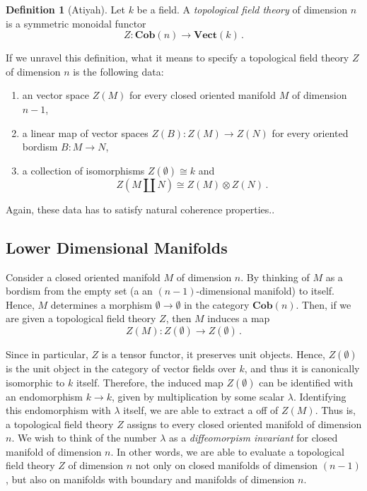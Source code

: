 \documentclass[a4paper,11pt]{article}
\theoremstyle{plain}
\theoremstyle{definition}
\newtheorem{defi}[thm]{Definition}
\theoremstyle{remark}
\begin{document}
\begin{defi}[Atiyah]
Let $k$ be a field. A \textit{topological field theory} of dimension $n$ is a symmetric monoidal functor 
$$Z \colon \textbf{Cob}(n) \to \textbf{Vect}(k) \, .$$
\end{defi}


If we unravel this definition, what it means to specify a topological field theory $Z$ of dimension $n$ is the following data:
\begin{enumerate}[label = \roman*)]
    \item an vector space $Z(M)$ for every closed oriented manifold $M$ of dimension $n-1$, 
    \item a linear map of vector spaces $Z(B) \colon Z(M) \to Z(N)$ for every oriented bordism $B \colon M \to N$, 
    \item a collection of isomorphisms $Z(\emptyset) \cong k$ and 
    $$Z \left( M \coprod N\right) \cong Z(M) \otimes Z(N) \,.$$
\end{enumerate}
Again, these data has to satisfy natural coherence properties.. 

\subsection{Lower Dimensional Manifolds}
\label{lower_dimensional}

Consider a closed oriented manifold $M$ of dimension $n$. By thinking of $M$ as a bordism from the empty set (a an $(n-1)$-dimensional manifold) to itself. Hence, $M$ determines a morphism $\emptyset \to \emptyset$ in the category $\textbf{Cob}(n)$. Then, if we are given a topological field theory $Z$, then $M$ induces a map 
$$Z(M) \colon Z(\emptyset) \to Z(\emptyset) \, .$$

Since in particular, $Z$ is a tensor functor, it preserves unit objects. Hence, $Z(\emptyset)$ is the unit object in the category of vector fields over $k$, and thus it is canonically isomorphic to $k$ itself. Therefore, the induced map $Z(\emptyset)$ can be identified with an endomorphism $k \to k$, given by multiplication by some scalar $\lambda$. Identifying this endomorphism with $\lambda$ itself, we are able to extract a  off of $Z(M)$. Thus is, a topological field theory $Z$ assigns to every closed oriented manifold of dimension $n$. We wish to think of the number $\lambda$ as a \textit{diffeomorpism invariant} for closed manifold of dimension $n$. In other words, we are able to evaluate a topological field theory $Z$ of dimension $n$ not only on closed manifolds of dimension $(n-1)$, but also on manifolds with boundary and manifolds of dimension $n$.
\end{document}
